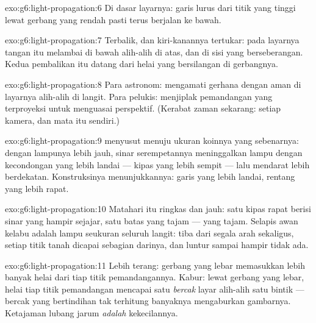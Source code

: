 \begin{solution}{exo:g6:light-propagation:6}
Di dasar layarnya: garis lurus dari titik yang tinggi lewat gerbang
yang rendah pasti terus berjalan ke bawah.
\end{solution}

\begin{solution}{exo:g6:light-propagation:7}
Terbalik, dan kiri-kanannya tertukar: pada layarnya tangan itu
melambai di bawah alih-alih di atas, dan di sisi yang berseberangan.
Kedua pembalikan itu datang dari helai yang bersilangan di gerbangnya.
\end{solution}

\begin{solution}{exo:g6:light-propagation:8}
Para astronom: mengamati gerhana dengan aman di layarnya alih-alih di
langit. Para pelukis: menjiplak pemandangan yang terproyeksi untuk
menguasai perspektif. (Kerabat zaman sekarang: setiap kamera, dan mata
itu sendiri.)
\end{solution}

\begin{solution}{exo:g6:light-propagation:9}
 menyusut menuju ukuran koinnya yang sebenarnya:
dengan lampunya lebih jauh, sinar serempetannya meninggalkan lampu
dengan kecondongan yang lebih landai --- kipas yang lebih sempit ---
lalu mendarat lebih berdekatan. Konstruksinya menunjukkannya: garis
yang lebih landai, rentang yang lebih rapat.
\end{solution}

\begin{solution}{exo:g6:light-propagation:10}
Matahari itu ringkas dan jauh: satu kipas rapat berisi sinar yang
hampir sejajar, satu batas yang tajam ---  yang tajam.
Selapis awan kelabu adalah lampu seukuran seluruh langit: 
tiba dari segala arah sekaligus, setiap titik tanah dicapai sebagian
darinya, dan  luntur sampai hampir tidak ada.
\end{solution}

\begin{solution}{exo:g6:light-propagation:11}
Lebih terang: gerbang yang lebar memasukkan lebih banyak helai dari
tiap titik pemandangannya. Kabur: lewat gerbang yang lebar, helai tiap
titik pemandangan mencapai satu \emph{bercak} layar alih-alih satu
bintik --- bercak yang bertindihan tak terhitung banyaknya mengaburkan
gambarnya. Ketajaman lubang jarum \emph{adalah} kekecilannya.
\end{solution}

